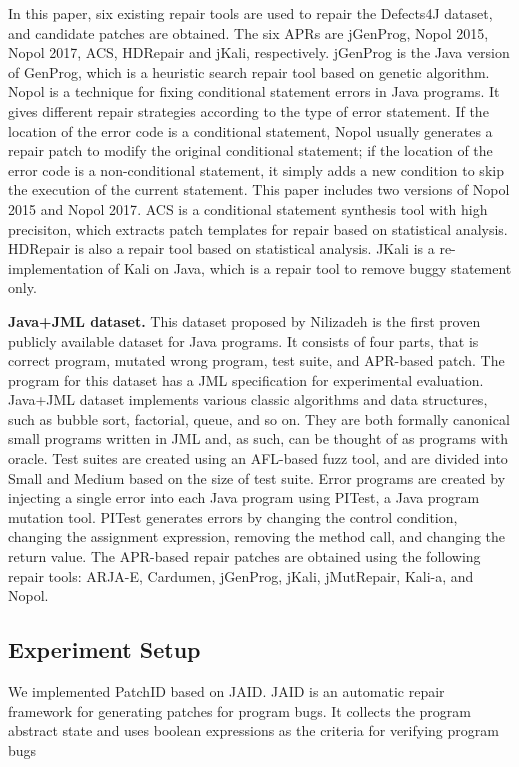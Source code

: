 \documentclass[sn-basic]{sn-jnl}
\theoremstyle{thmstyleone}
\theoremstyle{thmstyletwo}
\theoremstyle{thmstylethree}
\begin{document}
In this paper, six existing repair tools are used to repair the Defects4J dataset, and candidate patches are obtained. The six APRs are jGenProg, Nopol 2015, Nopol 2017, ACS, HDRepair and jKali, respectively. jGenProg is the Java version of GenProg, which is a heuristic search repair tool based on genetic algorithm. Nopol is a technique for fixing conditional statement errors in Java programs. It gives different repair strategies according to the type of error statement. If the location of the error code is a conditional statement, Nopol usually generates a repair patch to modify the original conditional statement; if the location of the error code is a non-conditional statement, it simply adds a new condition to skip the execution of the current statement. This paper includes two versions of Nopol 2015\citep{bib69} and Nopol 2017\citep{bib40}. ACS is a conditional statement synthesis tool with high precisiton, which extracts patch templates for repair based on statistical analysis. HDRepair is also a repair tool based on statistical analysis. JKali is a re-implementation of Kali on Java, which is a repair tool to remove buggy statement only.

\textbf{Java+JML dataset.} This dataset proposed by Nilizadeh is the first proven publicly available dataset for Java programs. It consists of four parts, that is correct program,  mutated wrong program, test suite, and APR-based patch. The program for this dataset has a JML specification for experimental evaluation. Java+JML dataset implements various classic algorithms and data structures, such as bubble sort, factorial, queue, and so on. They are both formally canonical small programs written in JML and, as such, can be thought of as programs with oracle. Test suites are created using an AFL-based fuzz tool, and are divided into Small and Medium based on the size of test suite. Error programs are created by injecting a single error into each Java program using PITest, a Java program mutation tool. PITest generates errors by changing the control condition, changing the assignment expression, removing the method call, and changing the return value. The APR-based repair patches are obtained using the following repair tools: ARJA-E, Cardumen, jGenProg, jKali, jMutRepair, Kali-a, and Nopol.
\subsection{Experiment Setup}
We implemented PatchID based on JAID. JAID is an automatic repair framework for generating patches for program bugs. It collects the program abstract state and uses boolean expressions as the criteria for verifying program bugs
\end{document}
